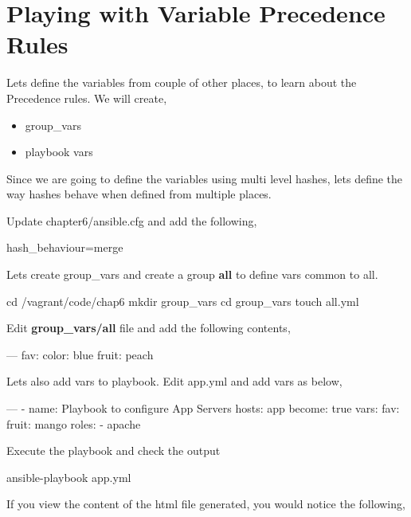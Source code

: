 \section{Playing with Variable Precedence Rules}

Lets define the variables from couple of other places, to learn about the Precedence rules. We will create,

\begin{itemize}
\item group\_vars
\item playbook vars
\end{itemize}

Since we are going to define the variables using multi level hashes, lets define the way hashes behave when defined from multiple places.

Update chapter6/ansible.cfg and add the following,

\begin{code}
hash_behaviour=merge
\end{code}

Lets create group\_vars and create a group \textbf{all} to define vars common to all.

\begin{code}
cd /vagrant/code/chap6
mkdir group_vars
cd group_vars
touch all.yml
\end{code}

Edit \textbf{group\_vars/all} file and add the following contents,

\begin{code}
---
  fav:
    color: blue
    fruit: peach

\end{code}

Lets also add vars to playbook. Edit app.yml and add vars as below,

\begin{code}
---
  - name: Playbook to configure App Servers
    hosts: app
    become: true
    vars:
      fav:
        fruit: mango
    roles:
    - apache
\end{code}

Execute the playbook and check the output

\begin{code}
ansible-playbook app.yml
\end{code}

If you view the content of the html file generated, you would notice the following,

